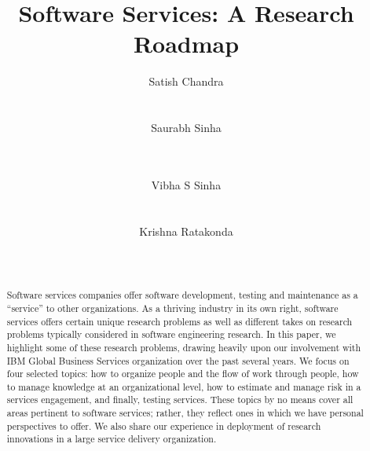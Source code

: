 \documentclass{sig-alternate}
\begin{document}

\title{Software Services: A Research Roadmap}


\author{
\alignauthor Satish Chandra\\
       \\
       \\
\alignauthor Saurabh Sinha\\
	\\
	\\
\and
\alignauthor Vibha S Sinha\\
	\\
	\\
\alignauthor Krishna Ratakonda\\
	\\
	\\
}

\maketitle

\begin{abstract}

Software services companies offer software development, testing and maintenance
as a ``service'' to other organizations.  As a thriving industry in its own
right, software services offers certain unique research problems as well as
different takes on research problems typically considered in software
engineering research. In this paper, we highlight some of these research
problems, drawing heavily upon our involvement with IBM Global Business Services
organization over the past several years.  We focus on four selected topics: how
to organize people and the flow of work through people, how to manage knowledge
at an organizational level, how to estimate and manage risk in a services
engagement, and finally, testing services. These topics by no means cover all
areas pertinent to software services; rather, they reflect ones in which we have
personal perspectives to offer.  We also share our experience in deployment of
research innovations in a large service delivery organization.

\end{abstract}
\end{document}
